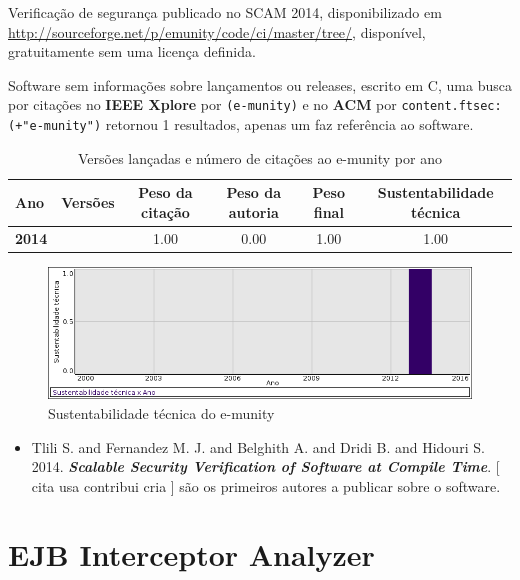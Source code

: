 Verificação de segurança
publicado no SCAM 2014,
disponibilizado em \url{http://sourceforge.net/p/emunity/code/ci/master/tree/},
disponível,
gratuitamente
sem uma licença definida.

Software sem informações sobre lançamentos ou releases,
escrito em C,
uma busca por citações no {\bf IEEE Xplore} por
\texttt{(e-munity)}
e no {\bf ACM} por
\texttt{content.ftsec:(+"e-munity")}
retornou
1 resultados,
apenas um faz referência ao software.


\begin{table}[H]
\caption{Versões lançadas e número de citações ao e-munity por ano}
\centering
\begin{tabular}{| l | c | c | c | c | c |}
  \hline
  Ano & Versões & Peso da citação & Peso da autoria & Peso final & Sustentabilidade técnica \\
  \hline
            {\bf 2014}
          &
          
          &
          1.00
          &
          0.00
          &
          1.00
          &
            {\color{blue} 1.00}
          \\
\hline
\end{tabular}
\end{table}

\begin{figure}[h]
  \center
  \includegraphics[scale=0.50]{result-documents/charts/e-munity.png}
  \caption{Sustentabilidade técnica do e-munity}
\end{figure}


\begin{itemize}
\item Tlili S. and Fernandez M. J. and Belghith A. and Dridi B. and Hidouri S.
      2014.
        \textbf{\textit{ Scalable Security Verification of Software at Compile Time}}.
      [
          cita
          usa
          contribui
          cria
      ]
são os primeiros autores a publicar sobre o software.
\end{itemize}
\section{EJB Interceptor Analyzer}

